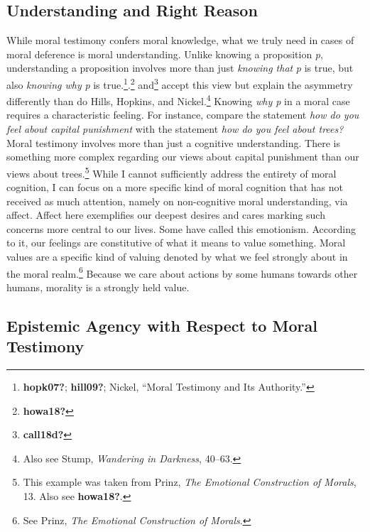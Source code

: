 \documentclass[
  12pt,
]{book}
\theoremstyle{definition}
\theoremstyle{definition}
\theoremstyle{definition}
\theoremstyle{definition}
\theoremstyle{remark}
\begin{document}
\subsection*{Understanding and Right Reason}\label{understanding-and-right-reason}

While moral testimony confers moral knowledge, what we truly need in cases of moral deference is moral understanding. Unlike knowing a proposition \emph{p}, understanding a proposition involves more than just \emph{knowing that} \emph{p} is true, but also \emph{knowing why} \emph{p} is true.\footnote{\textbf{hopk07?}; \textbf{hill09?}; Nickel, {``Moral {Testimony} and Its {Authority}.''}}.\footnote{\textbf{howa18?}} and\footnote{\textbf{call18d?}} accept this view but explain the asymmetry differently than do Hills, Hopkins, and Nickel.\footnote{Also see Stump, \emph{Wandering in {Darkness}}, 40--63.} Knowing \emph{why p} in a moral case requires a characteristic feeling. For instance, compare the statement \emph{how do you feel about capital punishment} with the statement \emph{how do you feel about trees?} Moral testimony involves more than just a cognitive understanding. There is something more complex regarding our views about capital punishment than our views about trees.\footnote{This example was taken from Prinz, \emph{The {Emotional Construction} of {Morals}}, 13. Also see \textbf{howa18?}.} While I cannot sufficiently address the entirety of moral cognition, I can focus on a more specific kind of moral cognition that has not received as much attention, namely on non-cognitive moral understanding, via affect. Affect here exemplifies our deepest desires and cares marking such concerns more central to our lives. Some have called this emotionism. According to it, our feelings are constitutive of what it means to value something. Moral values are a specific kind of valuing denoted by what we feel strongly about in the moral realm.\footnote{See Prinz, \emph{The {Emotional Construction} of {Morals}}.} Because we care about actions by some humans towards other humans, morality is a strongly held value.

\subsection*{Epistemic Agency with Respect to Moral Testimony}\label{epistemic-agency-with-respect-to-moral-testimony}
\end{document}

